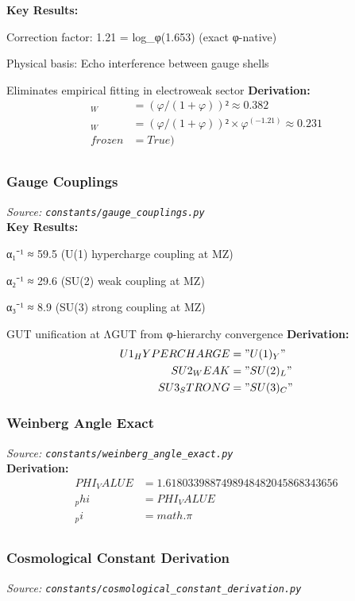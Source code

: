 \textbf{Key Results:}
\item Correction factor: 1.21 = log_φ(1.653) (exact φ-native)
\item Physical basis: Echo interference between gauge shells
\item Eliminates empirical fitting in electroweak sector
\textbf{Derivation:}
\begin{align}
_W &= (φ/(1+φ))² ≈ 0.382 \\
_W &= (φ/(1+φ))² × φ^(-1.21) ≈ 0.231 \\
frozen &= True) \\
\end{align}

\subsubsection{Gauge Couplings}
\textit{Source: \texttt{constants/gauge_couplings.py}}\\

\textbf{Key Results:}
\item α₁⁻¹ ≈ 59.5 (U(1) hypercharge coupling at MZ)
\item α₂⁻¹ ≈ 29.6 (SU(2) weak coupling at MZ)
\item α₃⁻¹ ≈ 8.9 (SU(3) strong coupling at MZ)
\item GUT unification at ΛGUT from φ-hierarchy convergence
\textbf{Derivation:}
\begin{align}
U1_HYPERCHARGE &= "U(1)_Y" \\
SU2_WEAK &= "SU(2)_L" \\
SU3_STRONG &= "SU(3)_C" \\
\end{align}

\subsubsection{Weinberg Angle Exact}
\textit{Source: \texttt{constants/weinberg_angle_exact.py}}\\

\textbf{Derivation:}
\begin{align}
PHI_VALUE &= 1.6180339887498948482045868343656 \\
_phi &= PHI_VALUE \\
_pi &= math.\pi \\
\end{align}

\subsubsection{Cosmological Constant Derivation}
\textit{Source: \texttt{constants/cosmological_constant_derivation.py}}\\

